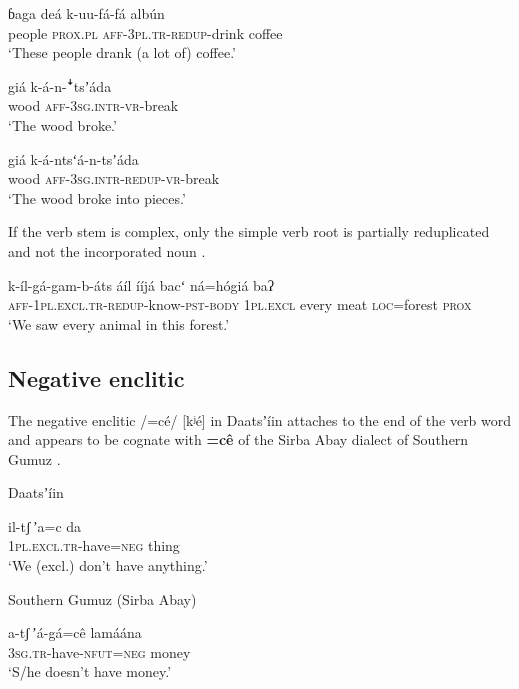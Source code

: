 \documentclass[output=paper]{langsci/langscibook}
\begin{document}
\ea\label{ex:ahlandc:37}
\gll
ɓaga  deá  k-uu-fá-fá   alb\'{u}n   \\
people  \textsc{prox.pl}  \textsc{aff-3pl.tr-redup}{}-drink   coffee \\
\glt
‘These people drank (a lot of) coffee.’ 
\z

\ea\label{ex:ahlandc:38}
\gll
giá     k-á-n-\textsf{ꜜ}tsʼáda \\
wood \textsc{aff-3sg.intr}{}-\textsc{vr-}break \\
\glt
‘The wood broke.’
\z

\ea\label{ex:ahlandc:39}
\gll
giá       k-á-ntsʻá-n-tsʼáda  \\
wood  \textsc{aff-3sg.intr}{}-\textsc{redup}{}-\textsc{vr}{}-break \\
\glt
 ‘The wood broke into pieces.’
\z

If the verb stem is complex, only the simple verb root is partially reduplicated and not the incorporated noun . 

\ea\label{ex:ahlandc:40}
\gll
k-íl-gá-gam-b-áts                                        áíl           ííjá      bacʻ   ná=h\'{o}giá  baʔ \\
\textsc{aff-1pl.excl.tr-redup}{}-know-\textsc{pst-body} \textsc{1pl.excl} every  meat  \textsc{loc}=forest \textsc{prox} \\
\glt
‘We saw every animal in this forest.’
\z


\subsection{Negative enclitic}\label{sec:ahlandc:4.8}

The negative enclitic /=cé/ [kʲé] in Daatsʼíin  attaches to the end of the verb word and appears to be cognate with \textbf{=c\^{e}} of the Sirba Abay dialect of Southern Gumuz  \citep[cf.][241-242]{Ahland2012Gumuz}. 

\ea\label{ex:ahlandc:41}
Daatsʼíin

\gll
{il-tʃ\,ʼa=c}   da \\
\textsc{  1pl.excl.tr}-have=\textsc{neg}     thing \\
\glt
  ‘We (excl.) don’t have anything.’
\z

\ea\label{ex:ahlandc:42}
Southern Gumuz (Sirba Abay)

\gll
  a-{tʃ\,ʼá}-gá=c\^{e}                      lamáána \\
\textsc{  3sg.tr}{}-have-\textsc{nfut=neg  } money \\
\glt
  ‘S/he doesn’t have money.’
\z
\end{document}

